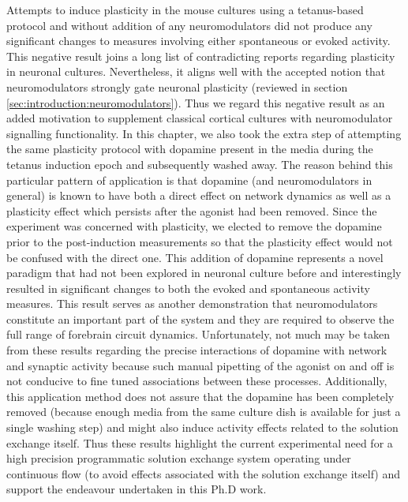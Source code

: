 Attempts to induce plasticity in the mouse cultures using a tetanus-based protocol and without addition of any neuromodulators did not produce any significant changes to measures involving either spontaneous or evoked activity. This negative result joins a long list of contradicting reports regarding plasticity in neuronal cultures. Nevertheless, it aligns well with the accepted notion that neuromodulators strongly gate neuronal plasticity (reviewed in section \ref{sec:introduction:neuromodulators}). Thus we regard this negative result as an added motivation to supplement classical cortical cultures with neuromodulator signalling functionality. In this chapter, we also took the extra step of attempting the same plasticity protocol with dopamine present in the media during the tetanus induction epoch and subsequently washed away. The reason behind this particular pattern of application is that dopamine (and neuromodulators in general) is known to have both a direct effect on network dynamics as well as a plasticity effect which persists after the agonist had been removed. Since the experiment was concerned with plasticity, we elected to remove the dopamine prior to the post-induction measurements so that the plasticity effect would not be confused with the direct one. This addition of dopamine represents a novel paradigm that had not been explored in neuronal culture before and interestingly resulted in significant changes to both the evoked and spontaneous activity measures. This result serves as another demonstration that neuromodulators constitute an important part of the system and they are required to observe the full range of forebrain circuit dynamics. Unfortunately, not much may be taken from these results regarding the precise interactions of dopamine with network and synaptic activity because such manual pipetting of the agonist on and off is not conducive to fine tuned associations between these processes. Additionally, this application method does not assure that the dopamine has been completely removed (because enough media from the same culture dish is available for just a single washing step) and might also induce activity effects related to the solution exchange itself. Thus these results highlight the current experimental need for a high precision programmatic solution exchange system operating under continuous flow (to avoid effects associated with the solution exchange itself) and support the endeavour undertaken in this Ph.D work.

